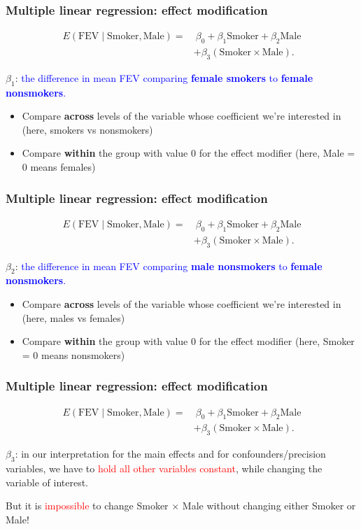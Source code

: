\documentclass[12pt, 
hyperref={colorlinks=true, linkcolor=blue, urlcolor=cyan}]{beamer}
\begin{document}
\begin{frame}
\frametitle{Multiple linear regression: effect modification}
\begin{align*}
E(\text{FEV} \mid \text{Smoker}, \text{Male}) = & \ \beta_0 + \beta_1 \text{Smoker} + \beta_2 \text{Male}\\
& + \beta_3 (\text{Smoker} \times \text{Male}).
\end{align*}

$\beta_1$: \textcolor{blue}{the difference in mean FEV comparing \textbf{female smokers} to \textbf{female nonsmokers}.}
\begin{itemize}
\item Compare \textbf{across} levels of the variable whose coefficient we're interested in (here, smokers vs nonsmokers)
\item Compare \textbf{within} the group with value 0 for the effect modifier (here, Male = 0 means females)
\end{itemize}
\end{frame}

\begin{frame}
\frametitle{Multiple linear regression: effect modification}
\begin{align*}
E(\text{FEV} \mid \text{Smoker}, \text{Male}) = & \ \beta_0 + \beta_1 \text{Smoker} + \beta_2 \text{Male}\\
& + \beta_3 (\text{Smoker} \times \text{Male}).
\end{align*}

$\beta_2$: \textcolor{blue}{the difference in mean FEV comparing \textbf{male nonsmokers} to \textbf{female nonsmokers}.}
\begin{itemize}
\item Compare \textbf{across} levels of the variable whose coefficient we're interested in (here, males vs females)
\item Compare \textbf{within} the group with value 0 for the effect modifier (here, Smoker = 0 means nonsmokers)
\end{itemize}
\end{frame}

\begin{frame}
\frametitle{Multiple linear regression: effect modification}
\begin{align*}
E(\text{FEV} \mid \text{Smoker}, \text{Male}) = & \ \beta_0 + \beta_1 \text{Smoker} + \beta_2 \text{Male}\\
& + \beta_3 (\text{Smoker} \times \text{Male}).
\end{align*}

$\beta_3$: in our interpretation for the main effects and for confounders/precision variables, we have to \textcolor{red}{hold all other variables constant}, while changing the variable of interest.

But it is \textcolor{red}{impossible} to change Smoker $\times$ Male without changing either Smoker or Male!
\end{frame}
\end{document}
